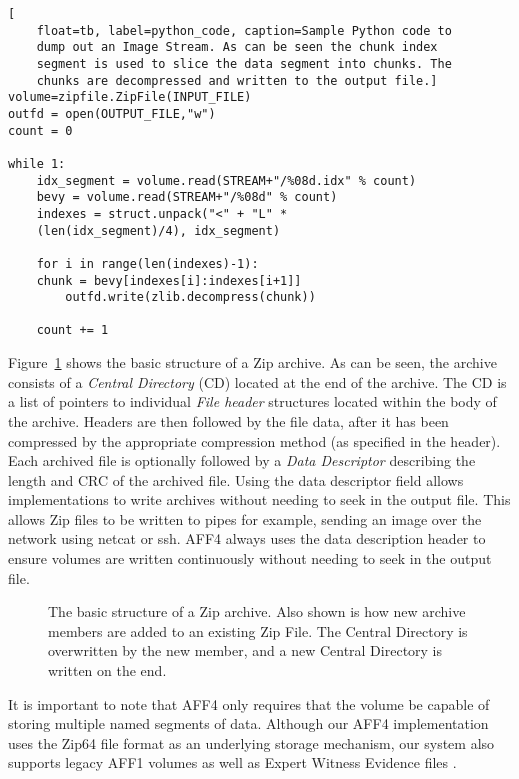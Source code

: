 \documentclass[10pt, conference]{IEEEtran}
\begin{document}
\begin{lstlisting}[
	float=tb, label=python_code, caption=Sample Python code to
	dump out an Image Stream. As can be seen the chunk index
	segment is used to slice the data segment into chunks. The
	chunks are decompressed and written to the output file.]
volume=zipfile.ZipFile(INPUT_FILE)
outfd = open(OUTPUT_FILE,"w")
count = 0

while 1:
    idx_segment = volume.read(STREAM+"/%08d.idx" % count)
    bevy = volume.read(STREAM+"/%08d" % count)
    indexes = struct.unpack("<" + "L" * 
	(len(idx_segment)/4), idx_segment)

    for i in range(len(indexes)-1):
	chunk = bevy[indexes[i]:indexes[i+1]]
        outfd.write(zlib.decompress(chunk))

    count += 1
\end{lstlisting}

Figure~\ref{zip_structure} shows the basic structure of a Zip
archive. As can be seen, the archive consists of a {\em Central Directory} (CD)
located at the end of the archive. The CD is a list of pointers to
individual {\em File header} structures located within the body of the
archive. Headers are then followed by the file data, after it has been
compressed by the appropriate compression method (as specified in the
header). Each archived file is optionally followed by a {\em Data
Descriptor} describing the length and CRC of the archived file. Using
the data descriptor field allows implementations to write archives
without needing to seek in the output file. This allows Zip files to
be written to pipes for example, sending an image over the network
using netcat or ssh. AFF4 always uses the data description header to
ensure volumes are written continuously without needing to seek in the
output file.

\begin{figure}[tbp]
  \begin{center}
  \mbox{\columnwidth {}}

  \caption{The basic structure of a Zip archive. Also shown is how new
  archive members are added to an existing Zip File. The Central
  Directory is overwritten by the new member, and a new Central
  Directory is written on the end.  }

  \label{zip_structure}
  \end{center}
\end{figure}

It is important to note that AFF4 only requires that the volume be
capable of storing multiple named segments of data. Although our AFF4
implementation uses the Zip64 file format as an underlying storage
mechanism, our system also supports legacy AFF1 volumes as well as
Expert Witness Evidence files \cite{libewf}.
\end{document}

